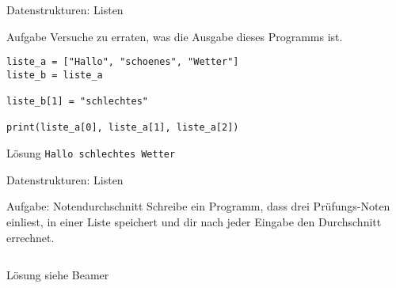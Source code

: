 \begin{frame}[fragile]{Datenstrukturen: Listen}
\begin{block}{Aufgabe}
Versuche zu erraten, was die Ausgabe dieses Programms ist.
\end{block}

\begin{lstlisting}
liste_a = ["Hallo", "schoenes", "Wetter"]
liste_b = liste_a

liste_b[1] = "schlechtes"

print(liste_a[0], liste_a[1], liste_a[2])  
\end{lstlisting}
\pause{}
\begin{exampleblock}{Lösung}
    \texttt{Hallo schlechtes Wetter}
\end{exampleblock}
\end{frame}

\begin{frame}[fragile]{Datenstrukturen: Listen}
\begin{block}{Aufgabe: Notendurchschnitt}
Schreibe ein Programm, dass drei Prüfungs-Noten einliest, in einer
Liste speichert und dir nach jeder Eingabe den Durchschnitt errechnet. 
\end{block}
\begin{lstlisting}

\end{lstlisting}
\pause{}
\begin{exampleblock}{Lösung}
siehe Beamer
\end{exampleblock}
\end{frame}

